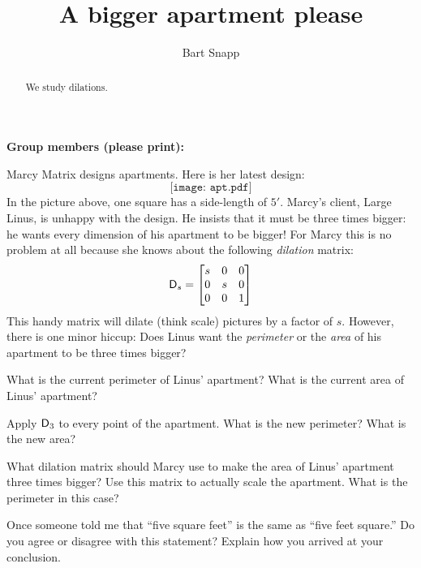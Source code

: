 \documentclass[handout,nooutcomes,noauthor]{ximera}
\title{A bigger apartment please}
\author{Bart Snapp}
\begin{document}
\begin{abstract}
  We study dilations.
\end{abstract}
\maketitle

\noindent\textbf{Group members (please print):}\ \hrulefill \\

\hrulefill


Marcy Matrix designs apartments. Here is her latest design:
\[
\texttt{[image: apt.pdf]}
\]
In the picture above, one square has a side-length of $5'$.  Marcy's
client, Large Linus, is unhappy with the design. He insists that it
must be three times bigger:  he wants every dimension of his
apartment to be bigger! For Marcy this is no problem at all because she
knows about the following \textit{dilation} matrix:
\[
\mathsf{D}_s = \begin{bmatrix}
s & 0 & 0 \\
0 & s & 0 \\
0 & 0 & 1
\end{bmatrix}
\]
This handy matrix will dilate (think scale) pictures by a factor of
$s$. However, there is one minor hiccup: Does Linus want
the \textit{perimeter} or the \textit{area} of his apartment to be
three times bigger?

\begin{problem}
What is the current perimeter of Linus' apartment? What is the current
area of Linus' apartment?
\end{problem}

                         
\begin{problem}
Apply $\mathsf{D}_3$ to every point of the apartment. What is the new
perimeter? What is the new area?
\end{problem}

\begin{problem}
What dilation matrix should Marcy use to make the area of Linus' apartment
three times bigger?  Use this matrix to actually scale the
apartment. What is the perimeter in this case?
\end{problem}

\begin{problem}
Once someone told me that ``five square feet'' is the same as ``five
feet square.'' Do you agree or disagree with this statement?  Explain
how you arrived at your conclusion.
\end{problem}
\end{document}
